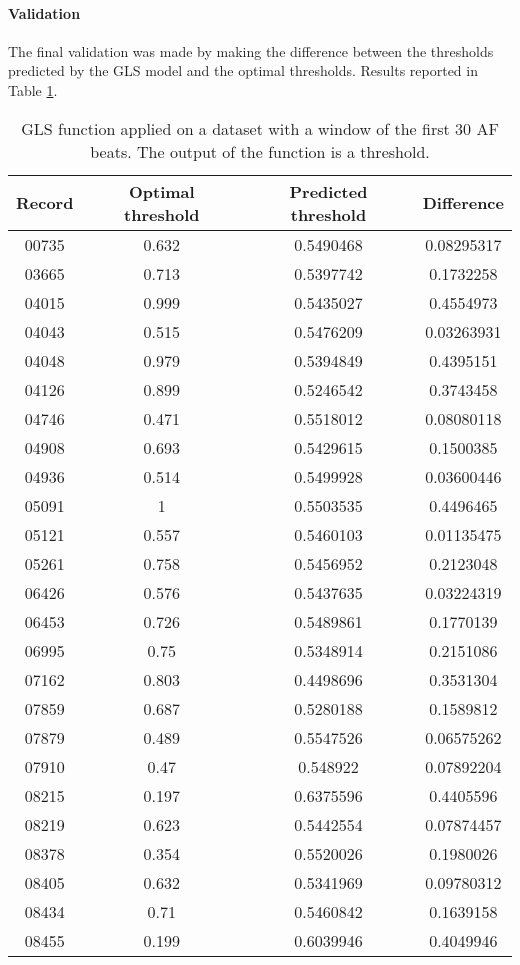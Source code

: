 \paragraph{Validation}
The final validation was made by making the difference between the thresholds predicted by the GLS model and the optimal thresholds. Results reported in Table \ref{table:clustering_ml}.
\begin{table}[h]
\begin{center}
\begin{threeparttable}
\caption{GLS function applied on a dataset with a window of the first 30 AF beats. The output of the function is a threshold.}
\label{table:clustering_ml}
\scriptsize
  \begin{tabular}{c c c c}
  \toprule
  \textbf{Record} & \textbf{Optimal threshold} & \textbf{Predicted threshold} & \textbf{Difference} \\
  \midrule  
  00735 & 0.632 & 0.5490468 & 0.08295317 \\
  03665 & 0.713 & 0.5397742 & 0.1732258 \\
  04015 & 0.999 & 0.5435027 & 0.4554973 \\
  04043 & 0.515 & 0.5476209 & 0.03263931 \\
  04048 & 0.979 & 0.5394849 & 0.4395151 \\
  04126 & 0.899 & 0.5246542 & 0.3743458 \\
  04746 & 0.471 & 0.5518012 & 0.08080118 \\
  04908 & 0.693 & 0.5429615 & 0.1500385 \\
  04936 & 0.514 & 0.5499928 & 0.03600446 \\
  05091 & 1 & 0.5503535 & 0.4496465 \\
  05121 & 0.557 & 0.5460103 & 0.01135475 \\ 
  05261 & 0.758 & 0.5456952 & 0.2123048 \\
  06426 & 0.576 & 0.5437635 & 0.03224319 \\
  06453 & 0.726 & 0.5489861 & 0.1770139 \\
  06995 & 0.75 & 0.5348914 & 0.2151086 \\
  07162 & 0.803 & 0.4498696 & 0.3531304 \\
  07859 & 0.687 & 0.5280188 & 0.1589812 \\
  07879 & 0.489 & 0.5547526 & 0.06575262 \\
  07910 & 0.47 & 0.548922 & 0.07892204 \\ 
  08215 & 0.197 & 0.6375596 & 0.4405596 \\
  08219 & 0.623 & 0.5442554 & 0.07874457 \\
  08378 & 0.354 & 0.5520026 & 0.1980026 \\
  08405 & 0.632 & 0.5341969 & 0.09780312 \\
  08434 & 0.71 & 0.5460842 & 0.1639158 \\
  08455 & 0.199 & 0.6039946 & 0.4049946 \\
  \bottomrule
\end{tabular}
\end{threeparttable}
\end{center}
\end{table}


